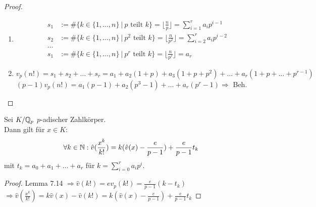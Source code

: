 \begin{proof}
\begin{enumerate}[(1)]
\item \begin{align*}
s_1&:=\#\{k \in \{1, \dots, n\} \ | \ p \text{ teilt } k \} = \lfloor \frac{n}{p} \rfloor = \sum_{i=1}^r a_i p^{i-1}\\
s_2&:=\#\{k \in \{1, \dots, n\} \ | \ p^2 \text{ teilt } k \} = \lfloor \frac{n}{p^2} \rfloor = \sum_{i=2}^r a_i p^{i-2}\\
\dots\\
s_1&:=\#\{k \in \{1, \dots, n\} \ | \ p^r \text{ teilt } k \} = \lfloor \frac{n}{p^r} \rfloor = a_r
\end{align*}
\item $v_p(n!)=s_1+s_2+\dots + s_r = a_1+a_2(1+p)+a_3(1+p+p^2)+\dots+a_r(1+p+\dots+p^{r-1})$\\
$(p-1)v_p(n!)=a_1(p-1)+a_2(p^3-1)+\dots+a_r(p^r-1) \Rightarrow$ Beh.
\end{enumerate}
\end{proof}

\begin{Lem}
Sei $K/\mathbb{Q}_p$ $p$-adischer Zahlkörper.\\
Dann gilt für $x \in K:$
\[\forall k \in \mathbb{N}: \hat v (\frac{x^k}{k!})=k(\hat v(x)-\frac{e}{p-1}) + \frac{e}{p-1}t_k\]
mit $t_k=a_0+a_1+\dots+a_r$ für $k=\sum_{i=0}^r a_i p^i$.
\end{Lem}

\begin{proof}
Lemma 7.14 $\Rightarrow \hat{v}(k!)= e v_p(k!)=\frac{e}{p-1}(k-t_k)$\\
$\Rightarrow \hat{v}(\frac{x^k}{k!})=k \hat{v}(x)-\hat{v}(k!)=k(\hat{v}(x)-\frac{e}{p-1})+\frac{e}{p-1}t_k$
\end{proof}

